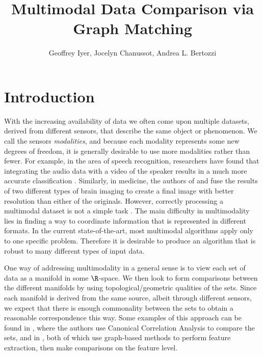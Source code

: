 \documentclass{article}[11pt]
\title{Multimodal Data Comparison via Graph Matching}
\author{Geoffrey Iyer, Jocelyn Chanussot, Andrea L. Bertozzi} \date{}
\begin{document}
\maketitle

\section{Introduction}
\label{sec:intro}

With the increasing availability of data we often come upon multiple datasets,
derived from different sensors, that describe the same object or phenomenon. We
call the sensors \emph{modalities}, and because each modality represents some
new degrees of freedom, it is generally desirable to use more modalities rather
than fewer.  For example, in the area of speech recognition, researchers have
found that integrating the audio data with a video of the speaker results in a
much more accurate classification \cite{Potamianos03,
  sedighin:hal-01400542}. Similarly, in medicine, the authors of \cite{Lei12}
and \cite{Samadi2016} fuse the results of two different types of brain imaging
to create a final image with better resolution than either of the
originals. However, correctly processing a multimodal dataset is not a simple
task \cite{lahat:hal-01062366}.  The main difficulty in multimodality lies in
finding a way to coordinate information that is represented in different
formats. In the current state-of-the-art, most multimodal algorithms apply only
to one specific problem. Therefore it is desirable to produce an algorithm that
is robust to many different types of input data.

One way of addressing multimodality in a general sense is to view each set of
data as a manifold in some $\R$-space. We then look to form comparisons between
the different manifolds by using topological/geometric qualities of the
sets. Since each manifold is derived from the same source, albeit through
different sensors, we expect that there is enough commonality between the sets
to obtain a reasonable correspondence this way. Some examples of this approach
can be found in \cite{Yeh14}, where the authors use Canonical Correlation
Analysis to compare the sets, and in \cite{Wang:2013:MAP:2540128.2540378,
  Tuia2016}, both of which use graph-based methods to perform feature
extraction, then make comparisons on the feature level.
\end{document}
